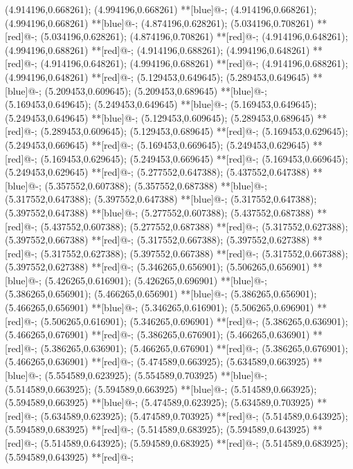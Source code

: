 (4.914196,0.668261); (4.994196,0.668261) **[blue]@{-};
(4.914196,0.668261); (4.994196,0.668261) **[blue]@{-};
(4.874196,0.628261); (5.034196,0.708261) **[red]@{-};
(5.034196,0.628261); (4.874196,0.708261) **[red]@{-};
(4.914196,0.648261); (4.994196,0.688261) **[red]@{-};
(4.914196,0.688261); (4.994196,0.648261) **[red]@{-};
(4.914196,0.648261); (4.994196,0.688261) **[red]@{-};
(4.914196,0.688261); (4.994196,0.648261) **[red]@{-};
(5.129453,0.649645); (5.289453,0.649645) **[blue]@{-};
(5.209453,0.609645); (5.209453,0.689645) **[blue]@{-};
(5.169453,0.649645); (5.249453,0.649645) **[blue]@{-};
(5.169453,0.649645); (5.249453,0.649645) **[blue]@{-};
(5.129453,0.609645); (5.289453,0.689645) **[red]@{-};
(5.289453,0.609645); (5.129453,0.689645) **[red]@{-};
(5.169453,0.629645); (5.249453,0.669645) **[red]@{-};
(5.169453,0.669645); (5.249453,0.629645) **[red]@{-};
(5.169453,0.629645); (5.249453,0.669645) **[red]@{-};
(5.169453,0.669645); (5.249453,0.629645) **[red]@{-};
(5.277552,0.647388); (5.437552,0.647388) **[blue]@{-};
(5.357552,0.607388); (5.357552,0.687388) **[blue]@{-};
(5.317552,0.647388); (5.397552,0.647388) **[blue]@{-};
(5.317552,0.647388); (5.397552,0.647388) **[blue]@{-};
(5.277552,0.607388); (5.437552,0.687388) **[red]@{-};
(5.437552,0.607388); (5.277552,0.687388) **[red]@{-};
(5.317552,0.627388); (5.397552,0.667388) **[red]@{-};
(5.317552,0.667388); (5.397552,0.627388) **[red]@{-};
(5.317552,0.627388); (5.397552,0.667388) **[red]@{-};
(5.317552,0.667388); (5.397552,0.627388) **[red]@{-};
(5.346265,0.656901); (5.506265,0.656901) **[blue]@{-};
(5.426265,0.616901); (5.426265,0.696901) **[blue]@{-};
(5.386265,0.656901); (5.466265,0.656901) **[blue]@{-};
(5.386265,0.656901); (5.466265,0.656901) **[blue]@{-};
(5.346265,0.616901); (5.506265,0.696901) **[red]@{-};
(5.506265,0.616901); (5.346265,0.696901) **[red]@{-};
(5.386265,0.636901); (5.466265,0.676901) **[red]@{-};
(5.386265,0.676901); (5.466265,0.636901) **[red]@{-};
(5.386265,0.636901); (5.466265,0.676901) **[red]@{-};
(5.386265,0.676901); (5.466265,0.636901) **[red]@{-};
(5.474589,0.663925); (5.634589,0.663925) **[blue]@{-};
(5.554589,0.623925); (5.554589,0.703925) **[blue]@{-};
(5.514589,0.663925); (5.594589,0.663925) **[blue]@{-};
(5.514589,0.663925); (5.594589,0.663925) **[blue]@{-};
(5.474589,0.623925); (5.634589,0.703925) **[red]@{-};
(5.634589,0.623925); (5.474589,0.703925) **[red]@{-};
(5.514589,0.643925); (5.594589,0.683925) **[red]@{-};
(5.514589,0.683925); (5.594589,0.643925) **[red]@{-};
(5.514589,0.643925); (5.594589,0.683925) **[red]@{-};
(5.514589,0.683925); (5.594589,0.643925) **[red]@{-};
